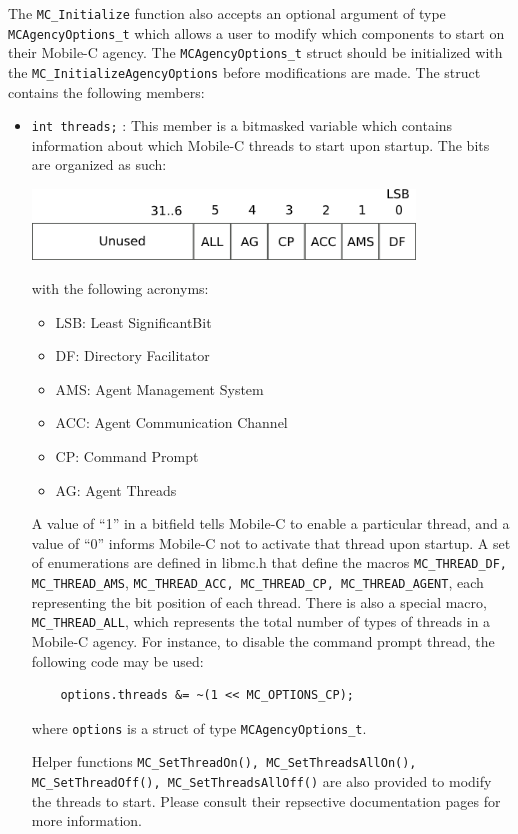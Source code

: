 The \texttt{MC\_Initialize} function also accepts an optional argument of type
\texttt{MCAgencyOptions\_t} which allows a user to modify which components to
start on their Mobile-C agency. The \texttt{MCAgencyOptions\_t} struct should be initialized with the 
\texttt{MC\_InitializeAgencyOptions} before modifications are made. The struct contains the following
members:
\begin{itemize}
  \item \texttt{int threads;} : This member is a bitmasked variable which contains information
  about which Mobile-C threads to start upon startup. The bits are organized as such:

  \includegraphics[width=4in]{figure/mobilec_threads_bitfields.png} 
  
  with the following acronyms:
    \begin{itemize}
      \item LSB: Least SignificantBit
      \item DF: Directory Facilitator
      \item AMS: Agent Management System
      \item ACC: Agent Communication Channel
      \item CP: Command Prompt
      \item AG: Agent Threads
    \end{itemize}
    A value of ``1'' in a bitfield tells Mobile-C to enable a particular thread,
    and a value of ``0'' informs Mobile-C not to activate that thread upon
    startup. A set of enumerations are defined in libmc.h that define the macros 
    \texttt{MC\_THREAD\_DF, MC\_THREAD\_AMS}, \texttt{MC\_THREAD\_ACC, MC\_THREAD\_CP, MC\_THREAD\_AGENT},
    each representing the bit position of each thread. There is also a 
    special macro, \texttt{MC\_THREAD\_ALL}, which represents the total number of 
    types of threads in a Mobile-C agency. For instance, to disable
    the command prompt thread, the following code may be used:
    \begin{verbatim}
    options.threads &= ~(1 << MC_OPTIONS_CP);
    \end{verbatim}
    where \texttt{options} is a struct of type \texttt{MCAgencyOptions\_t}.

    Helper functions \texttt{MC\_SetThreadOn(), MC\_SetThreadsAllOn(),
    MC\_SetThreadOff(), MC\_SetThreadsAllOff()} are also provided to modify the
    threads to start. Please consult their repsective documentation pages for
    more information.


\end{itemize}

